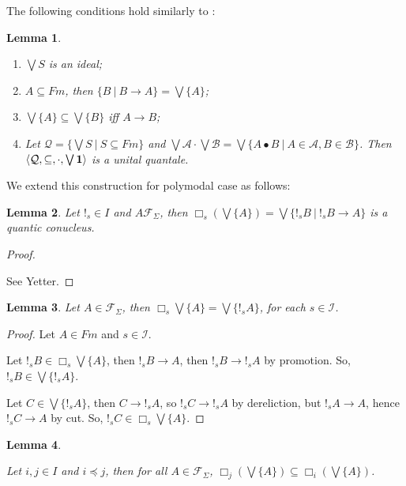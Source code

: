 \documentclass[a4paper]{article}
\theoremstyle{defin}
\theoremstyle{theorem}
\theoremstyle{prop}
\theoremstyle{lemma}
\newtheorem{lemma}{Lemma}
\theoremstyle{ex}
\theoremstyle{col}
\begin{document}
The following conditions hold similarly to \cite{Gurr}:

\begin{lemma}
$ $

  \begin{enumerate}
  \item $\bigvee S$ is an ideal;
  \item $A \subseteq Fm$, then $\{ B \: | \: B \rightarrow A \} = \bigvee \{ A \}$;
  \item $\bigvee \{ A \} \subseteq \bigvee \{ B \}$ iff $A \rightarrow B$;
  \item Let $\mathcal{Q} = \{ \bigvee S \: | \: S \subseteq Fm \}$ and $\bigvee \mathcal{A} \cdot \bigvee \mathcal{B} =
  \bigvee \{ A \bullet B \: | \: A \in \mathcal{A}, B \in \mathcal{B} \}$.
  Then $\langle \mathcal{Q}, \subseteq, \cdot, \bigvee{{\bf 1}}\rangle$ is a unital quantale.
  \end{enumerate}
\end{lemma}

We extend this construction for polymodal case as follows:

\begin{lemma}
Let $!_s \in I$ and $A \mathcal{F}_{\Sigma}$, then $\Box_s (\bigvee \{ A \}) = \bigvee \{ !_s B \: | \: !_s B \rightarrow A \}$
  is a quantic conucleus.
\end{lemma}

\begin{proof}
$ $

See Yetter.
\end{proof}

\begin{lemma}
  Let $A \in \mathcal{F}_{\Sigma}$, then $\Box_s \bigvee \{ A \} = \bigvee \{ !_s A \}$, for each $s \in \mathcal{I}$.
\end{lemma}

\begin{proof}
  Let $A \in Fm$ and $s \in \mathcal{I}$.

  Let $!_s B \in \Box_s \bigvee \{ A \}$, then $!_s B \rightarrow A$, then $!_s B \rightarrow !_s A$
  by promotion. So, $!_s B \in \bigvee \{ !_s A \}$.

  Let $C \in \bigvee \{ !_s A \}$, then $C \rightarrow !_s A$, so $!_s C \rightarrow !_s A$ by dereliction, but $!_s A \rightarrow A$, hence
  $!_s C \rightarrow A$ by cut. So, $!_s C \in \Box_s \bigvee \{ A \}$.
\end{proof}

\begin{lemma}
$ $

  Let $i, j \in I$ and $i \preceq j$, then for all $A \in \mathcal{F}_{\Sigma}$, $\Box_j (\bigvee \{ A \}) \subseteq \Box_i (\bigvee \{ A \})$.
\end{lemma}
\end{document}
